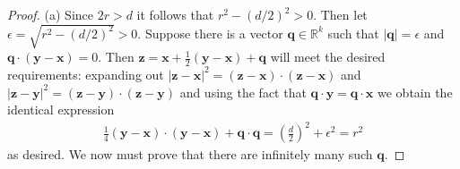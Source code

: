 \documentclass[12pt]{article}
\begin{document}
\begin{proof}
(a) Since $2r > d$ it follows that $r^2 - (d/2)^2 > 0$.  Then let $\epsilon = \sqrt{r^2 - (d/2)^2} > 0$.  Suppose there is a vector $\mathbf{q} \in \mathbb{R}^k$ such that $|\mathbf{q}| = \epsilon$ and $\mathbf{q} \cdot (\mathbf{y} - \mathbf{x} )= 0$.  Then $\mathbf{z} = \mathbf{x} + \frac{1}{2}(\mathbf{y} - \mathbf{x}) + \mathbf{q}$ will meet the desired requirements: expanding out $|\mathbf{z} - \mathbf{x}|^2 = (\mathbf{z} - \mathbf{x}) \cdot (\mathbf{z} - \mathbf{x})$ and $|\mathbf{z} - \mathbf{y}|^2 = (\mathbf{z} - \mathbf{y}) \cdot (\mathbf{z} - \mathbf{y})$ and using the fact that $\mathbf{q}\cdot \mathbf{y} = \mathbf{q} \cdot \mathbf{x}$ we obtain the identical expression
\begin{align}
\frac{1}{4}(\mathbf{y} - \mathbf{x})\cdot (\mathbf{y} - \mathbf{x}) + \mathbf{q}\cdot \mathbf{q} = \left(\frac{d}{2}\right)^2 + \epsilon^2 = r^2
\end{align}
as desired.  We now must prove that there are infinitely many such $\mathbf{q}$.  


\end{proof}
\end{document}
